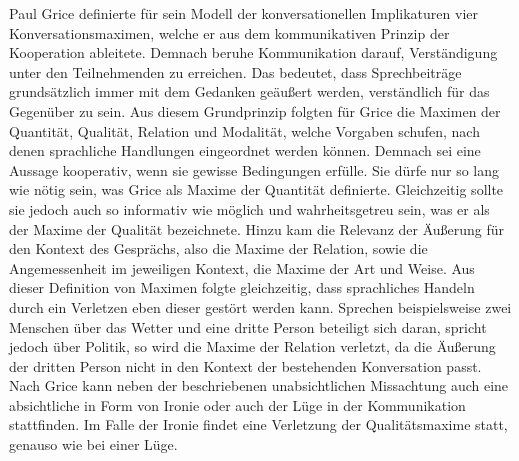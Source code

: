 Paul Grice definierte für sein Modell der konversationellen Implikaturen vier Konversationsmaximen, welche er aus dem kommunikativen Prinzip der Kooperation ableitete.
Demnach beruhe Kommunikation darauf, Verständigung unter den Teilnehmenden zu erreichen.
Das bedeutet, dass Sprechbeiträge grundsätzlich immer mit dem Gedanken geäußert werden, verständlich für das Gegenüber zu sein.
Aus diesem Grundprinzip folgten für Grice die Maximen der Quantität, Qualität, Relation und Modalität, welche Vorgaben schufen, nach denen sprachliche Handlungen eingeordnet werden können.
Demnach sei eine Aussage kooperativ, wenn sie gewisse Bedingungen erfülle.
Sie dürfe nur so lang wie nötig sein, was Grice als Maxime der Quantität definierte.
Gleichzeitig sollte sie jedoch auch so informativ wie möglich und wahrheitsgetreu sein, was er als der Maxime der Qualität bezeichnete.
Hinzu kam die Relevanz der Äußerung für den Kontext des Gesprächs, also die Maxime der Relation, sowie die Angemessenheit im jeweiligen Kontext, die Maxime der Art und Weise.
Aus dieser Definition von Maximen folgte gleichzeitig, dass sprachliches Handeln durch ein Verletzen eben dieser gestört werden kann.
Sprechen beispielsweise zwei Menschen über das Wetter und eine dritte Person beteiligt sich daran, spricht jedoch über Politik, so wird die Maxime der Relation verletzt, da die Äußerung der dritten Person nicht in den Kontext der bestehenden Konversation passt.
Nach Grice kann neben der beschriebenen unabsichtlichen Missachtung auch eine absichtliche in Form von Ironie oder auch der Lüge in der Kommunikation stattfinden.
Im Falle der Ironie findet eine Verletzung der Qualitätsmaxime statt, genauso wie bei einer Lüge.

